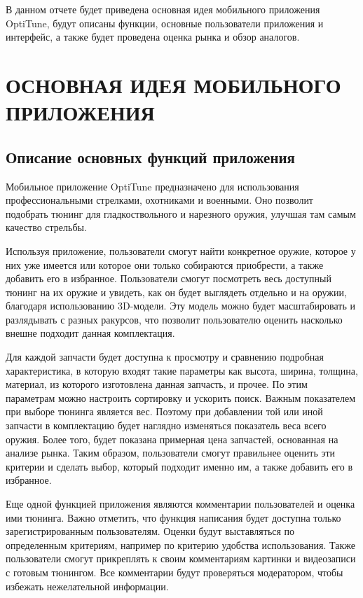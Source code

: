 \documentclass[14pt]{extreport}
\begin{document}
\pagestyle{empty} 


\pagestyle{plain}
\tableofcontents
 



\intro 

В данном отчете будет приведена основная идея мобильного приложения OptiTune, будут описаны функции, основные пользователи приложения и интерфейс, а также будет проведена оценка рынка и обзор аналогов.


\chapter{ОСНОВНАЯ ИДЕЯ МОБИЛЬНОГО ПРИЛОЖЕНИЯ\label{chapter1}}
\section{Описание основных функций приложения}

Мобильное приложение OptiTune предназначено для использования профессиональными стрелками, охотниками и военными. Оно позволит подобрать тюнинг для гладкоствольного и нарезного оружия, улучшая там самым качество стрельбы.

Используя приложение, пользователи смогут найти конкретное оружие, которое у них уже имеется или которое они только собираются приобрести, а также добавить его в избранное. Пользователи смогут посмотреть весь доступный тюнинг на их оружие и увидеть, как он будет выглядеть отдельно и на оружии, благодаря использованию 3D-модели. Эту модель можно будет масштабировать и разлядывать с разных ракурсов, что позволит пользователю оценить насколько внешне подходит данная комплектация.

Для каждой запчасти будет доступна к просмотру и сравнению подробная характеристика, в которую входят такие параметры как высота, ширина, толщина, материал, из которого изготовлена данная запчасть, и прочее. По этим параметрам можно настроить сортировку и ускорить поиск. Важным показателем при выборе тюнинга является вес. Поэтому при добавлении той или иной запчасти в комплектацию будет наглядно изменяться показатель веса всего оружия. Более того, будет показана примерная цена запчастей, основанная на анализе рынка. Таким образом, пользователи смогут правильнее оценить эти критерии и сделать выбор, который подходит именно им, а также добавить его в избранное.

Еще одной функцией приложения являются комментарии пользователей и оценка ими тюнинга. Важно отметить, что функция написания будет доступна только зарегистрированным пользователям. Оценки будут выставляться по определенным критериям, например по критерию удобства использования. Также пользователи смогут прикреплять к своим комментариям картинки и видеозаписи с готовым тюнингом. Все комментарии будут проверяться модератором, чтобы избежать нежелательной информации.
\end{document}
